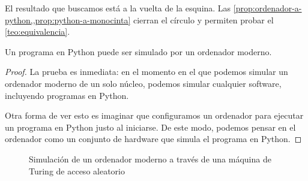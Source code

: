 El resultado que buscamos está a la vuelta de la esquina. Las \cref{prop:ordenador-a-python,,prop:python-a-monocinta} cierran el círculo y permiten probar el \cref{teo:equivalencia}. \cite{Sipser2012,MacCormick2018}


\begin{proposicion}\label{prop:ordenador-a-python}
Un programa en Python puede ser simulado por un ordenador moderno.
\end{proposicion}
\begin{proof}
La prueba es inmediata: en el momento en el que podemos simular un ordenador moderno de un solo núcleo, podemos simular cualquier software, incluyendo programas en Python.

Otra forma de ver esto es imaginar que configuramos un ordenador para ejecutar un programa en Python justo al iniciarse. De este modo, podemos pensar en el ordenador como un conjunto de hardware que simula el programa en Python.
\end{proof}

\pagebreak
\vspace*{2cm}
\begin{figure}[h]
\centering

\caption{Simulación de un ordenador moderno a través de una máquina de Turing de acceso aleatorio}
\label{fig:simulacion-mtr-ordenador}
\end{figure}
\vfill
\pagebreak

